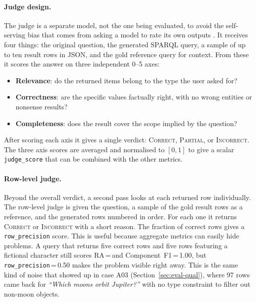 \documentclass[11pt,a4paper]{article}
\newcommand{\cmark}{\ding{51}}%
\begin{document}
\paragraph{Judge design.}
The judge is a separate model, not the one being evaluated, to avoid
the self-serving bias that comes from asking a model to rate its own
outputs \cite{zheng2023judging}. It receives four things: the original
question, the generated SPARQL query, a sample of up to ten result
rows in JSON, and the gold reference query for context. From these it
scores the answer on three independent 0--5 axes:

\begin{itemize}
    \item \textbf{Relevance}: do the returned items belong to the type
          the user asked for?
    \item \textbf{Correctness}: are the specific values factually right,
          with no wrong entities or nonsense results?
    \item \textbf{Completeness}: does the result cover the scope implied
          by the question?
\end{itemize}

After scoring each axis it gives a single verdict: \textsc{Correct},
\textsc{Partial}, or \textsc{Incorrect}. The three axis scores are
averaged and normalised to $[0,1]$ to give a scalar
\texttt{judge\_score} that can be combined with the other metrics.

\paragraph{Row-level judge.}
Beyond the overall verdict, a second pass looks at each returned row
individually. The row-level judge is given the question, a sample of
the gold result rows as a reference, and the generated rows numbered
in order. For each one it returns \textsc{Correct} or
\textsc{Incorrect} with a short reason. The fraction of correct rows
gives a \texttt{row\_precision} score. This is useful because
aggregate metrics can easily hide problems. A query that returns five
correct rows and five rows featuring a fictional character still scores
RA\,=\,\cmark and Component~F1\,=\,1.00, but
\texttt{row\_precision}\,=\,0.50 makes the problem visible right away.
This is the same kind of noise that showed up in case A03
(Section~\ref{sec:eval-qual}), where 97 rows came back for
\emph{``Which moons orbit Jupiter?''} with no type constraint to
filter out non-moon objects.
\end{document}
